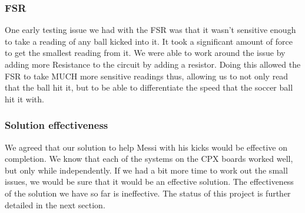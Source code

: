 \documentclass[12pt]{article}
\begin{document}
\subsubsection{FSR}

One early testing issue we had with the FSR was that it wasn't sensitive enough to take a reading of any ball kicked into it. It took a significant amount of force to get the smallest reading from it. We were able to work around the issue by adding more Resistance to the circuit by adding a resistor. Doing this allowed the FSR to take MUCH more sensitive readings thus, allowing us to not only read that the ball hit it, but to be able to differentiate the speed that the soccer ball hit it with. 

\subsubsection{Solution effectiveness}

We agreed that our solution to help Messi with his kicks would be effective on completion. We know that each of the systems on the CPX boards worked well, but only while independently. If we had a bit more time to work out the small issues, we would be sure that it would be an effective solution. The effectiveness of the solution we have so far is ineffective. The status of this project is further detailed in the next section. 




\end{document}
